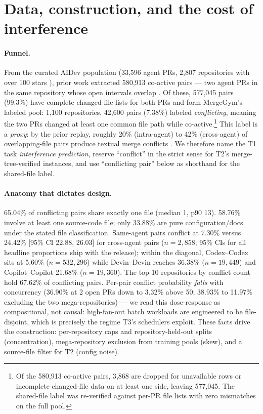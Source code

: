 \documentclass{article}
\begin{document}
\section{Data, construction, and the cost of interference}
\label{sec:data}

\paragraph{Funnel.} From the curated AIDev population (33{,}596 agent PRs, 2{,}807 repositories with over 100 stars \citep{li2026aidev}), prior work extracted 580{,}913 co-active pairs --- two agent PRs in the same repository whose open intervals overlap \citep{xu2026agentprs}. %
Of these, 577{,}045 pairs (99.3\%) have complete changed-file lists for both PRs and form MergeGym's labeled pool: 1{,}100 repositories, 42{,}600 pairs (7.38\%) labeled \emph{conflicting}, meaning the two PRs changed at least one common file path while co-active.\footnote{Of the 580{,}913 co-active pairs, 3{,}868 are dropped for unavailable rows or incomplete changed-file data on at least one side, leaving 577{,}045. The shared-file label was re-verified against per-PR file lists with zero mismatches on the full pool.} %
This label is a \emph{proxy}: by the prior replay, roughly 20\% (intra-agent) to 42\% (cross-agent) of overlapping-file pairs produce textual merge conflicts \citep{xu2026agentprs}. We therefore name the T1 task \emph{interference prediction}, reserve ``conflict'' in the strict sense for T2's merge-tree-verified instances, and use ``conflicting pair'' below as shorthand for the shared-file label.

\paragraph{Anatomy that dictates design.} 65.04\% of conflicting pairs share exactly one file (median 1, p90 13). %
58.76\% involve at least one source-code file; only 33.88\% are pure configuration/docs under the stated file classification. %
Same-agent pairs conflict at 7.30\% versus 24.42\% [95\% CI 22.88, 26.03] for cross-agent pairs ($n{=}2{,}858$; 95\% CIs for all headline proportions ship with the release); within the diagonal, Codex--Codex sits at 5.60\% ($n{=}532{,}296$) while Devin--Devin reaches 36.38\% ($n{=}19{,}449$) and Copilot--Copilot 21.68\% ($n{=}19{,}360$). %
The top-10 repositories by conflict count hold 67.62\% of conflicting pairs. %
Per-pair conflict probability \emph{falls} with concurrency (36.90\% at 2 open PRs down to 3.32\% above 50; 38.93\% to 11.97\% excluding the two mega-repositories) --- we read this dose-response as compositional, not causal: high-fan-out batch workloads are engineered to be file-disjoint, which is precisely the regime T3's schedulers exploit. %
These facts drive the construction: per-repository caps and repository-held-out splits (concentration), mega-repository exclusion from training pools (skew), and a source-file filter for T2 (config noise).
\end{document}

